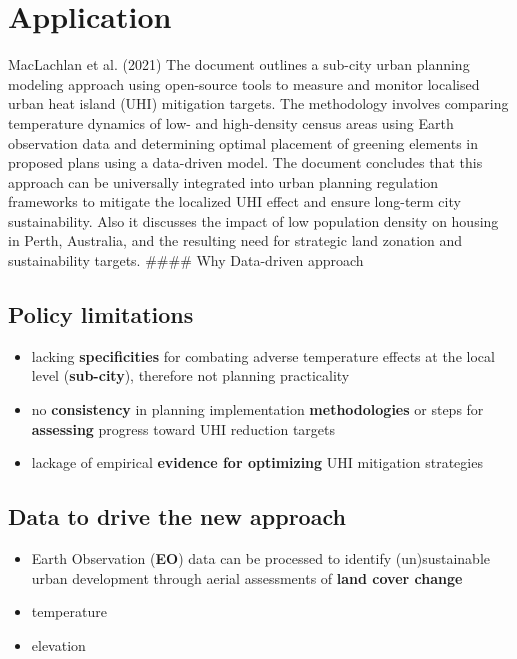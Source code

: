 \documentclass[
  letterpaper,
  DIV=11,
  numbers=noendperiod]{scrreprt}
\providecommand{\tightlist}{%
  \setlength{\itemsep}{0pt}\setlength{\parskip}{0pt}}\usepackage{longtable,booktabs,array}
\begin{document}
\hypertarget{application-3}{%
\section{Application}\label{application-3}}

MacLachlan et al. (2021) The document outlines a sub-city urban planning
modeling approach using open-source tools to measure and monitor
localised urban heat island (UHI) mitigation targets. The methodology
involves comparing temperature dynamics of low- and high-density census
areas using Earth observation data and determining optimal placement of
greening elements in proposed plans using a data-driven model. The
document concludes that this approach can be universally integrated into
urban planning regulation frameworks to mitigate the localized UHI
effect and ensure long-term city sustainability. Also it discusses the
impact of low population density on housing in Perth, Australia, and the
resulting need for strategic land zonation and sustainability targets.
\#\#\#\# Why Data-driven approach

\hypertarget{policy-limitations}{%
\subsection{Policy limitations}\label{policy-limitations}}

\begin{itemize}
\tightlist
\item
  lacking \textbf{specificities} for combating adverse temperature
  effects at the local level (\textbf{sub-city}), therefore not planning
  practicality
\item
  no \textbf{consistency} in planning implementation
  \textbf{methodologies} or steps for \textbf{assessing} progress toward
  UHI reduction targets
\item
  lackage of empirical \textbf{evidence for optimizing} UHI mitigation
  strategies
\end{itemize}

\hypertarget{data-to-drive-the-new-approach}{%
\subsection{Data to drive the new
approach}\label{data-to-drive-the-new-approach}}

\begin{itemize}
\tightlist
\item
  Earth Observation (\textbf{EO}) data can be processed to identify
  (un)sustainable urban development through aerial assessments of
  \textbf{land cover change}
\item
  temperature
\item
  elevation
\end{itemize}
\end{document}
